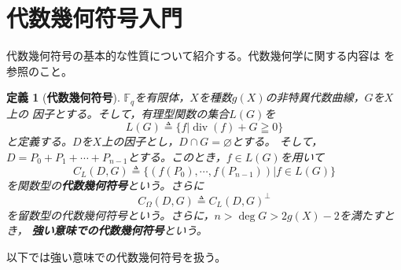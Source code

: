 \documentclass[12pt]{jarticle}
\theoremstyle{break}
\newtheorem{definition}[theorem]{定義}
\def\itOmega{\mathit{\Omega}}
\def\bF{\mathbb{F}}
\def\div{\operatorname{div}}
\begin{document}
\section{代数幾何符号入門}
代数幾何符号の基本的な性質について紹介する。代数幾何学に関する内容は
\cite{ogiso-AG2002}を参照のこと。
\begin{framed}
\begin{definition}[{\bf 代数幾何符号}]
$\bF_{q}$を有限体，$X$を種数$g(X)$の非特異代数曲線，$G$を$X$上の
因子とする。そして，有理型関数の集合$L(G)$を
\begin{equation}
L(G)\triangleq\{f|\div(f)+G\geqq 0\}\nonumber
\end{equation}
と定義する\footnotemark。$D$を$X$上の因子とし，$D\cap
G=\varnothing$とする。 そして，$D=P_{0}+P_{1}+\cdots+P_{n-1}$とする。このとき，$f\in L(G)$を用いて
\begin{equation}
C_{L}(D,G)\triangleq\{(f(P_{0}),\cdots,f(P_{n-1}))|f\in L(G)\}
\label{eq:def_function_code}
\end{equation}
を関数型の{\bf 代数幾何符号}という。さらに
\begin{equation}
C_{\itOmega}(D,G)\triangleq C_{L}(D,G)^{\perp}\nonumber
\end{equation}
を留数型の代数幾何符号という。さらに，$n>\deg G>2g(X)-2$を満たすとき，
{\bf 強い意味での代数幾何符号}という。
\end{definition}
\end{framed}
以下では強い意味での代数幾何符号を扱う。
\end{document}
